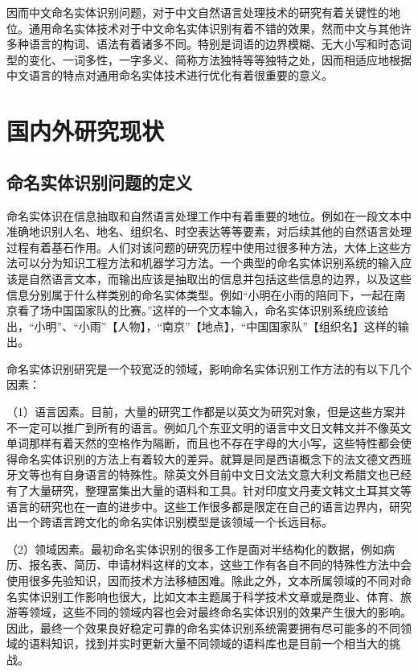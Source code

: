 \documentclass[winfonts,master,oneside,nobackinfo]{njuthesis}
\begin{document}
因而中文命名实体识别问题，对于中文自然语言处理技术的研究有着关键性的地位。通用命名实体技术对于中文命名实体识别有着不错的效果，然而中文与其他许多种语言的构词、语法有着诸多不同。特别是词语的边界模糊、无大小写和时态词型的变化、一词多性，一字多义、简称方法独特等等独特之处，因而相适应地根据中文语言的特点对通用命名实体技术进行优化有着很重要的意义。



\section{国内外研究现状}
\subsection{命名实体识别问题的定义}
命名实体识在信息抽取和自然语言处理工作中有着重要的地位。例如在一段文本中准确地识别人名、地名、组织名、时空表达等等要素，对后续其他的自然语言处理过程有着基石作用。人们对该问题的研究历程中使用过很多种方法，大体上这些方法可以分为知识工程方法和机器学习方法。一个典型的命名实体识别系统的输入应该是自然语言文本，而输出应该是抽取出的信息并包括这些信息的边界，以及这些信息分别属于什么样类别的命名实体类型。例如“小明在小雨的陪同下，一起在南京看了场中国国家队的比赛。”这样的一个文本输入，命名实体识别系统应该给出，“小明”、“小雨”【人物】，“南京”【地点】，“中国国家队”【组织名】这样的输出。

命名实体识别研究是一个较宽泛的领域，影响命名实体识别工作方法的有以下几个因素\cite{ASTUDY}：

（1）语言因素。目前，大量的研究工作都是以英文为研究对象，但是这些方案并不一定可以推广到所有的语言。例如几个东亚文明的语言中文日文韩文并不像英文单词那样有着天然的空格作为隔断，而且也不存在字母的大小写，这些特性都会使得命名实体识别的方法上有着较大的差异。就算是同是西语概念下的法文德文西班牙文等也有自身语言的特殊性。除英文外目前中文日文法文意大利文希腊文也已经有了大量研究，整理富集出大量的语料和工具。针对印度文丹麦文韩文土耳其文等语言的研究也在一直的进步中。这些工作很多都是限定在自己的语言边界内，研究出一个跨语言跨文化的命名实体识别模型是该领域一个长远目标。

（2）领域因素。最初命名实体识别的很多工作是面对半结构化的数据，例如病历、报名表、简历、申请材料这样的文本，这些工作有各自不同的特殊性方法中会使用很多先验知识，因而技术方法移植困难。除此之外，文本所属领域的不同对命名实体识别工作影响也很大，比如文本主题属于科学技术文章或是商业、体育、旅游等领域，这些不同的领域内容也会对最终命名实体识别的效果产生很大的影响。因此，最终一个效果良好稳定可靠的命名实体识别系统需要拥有尽可能多的不同领域的语料知识，找到并实时更新大量不同领域的语料库也是目前一个相当大的挑战。
\end{document}
